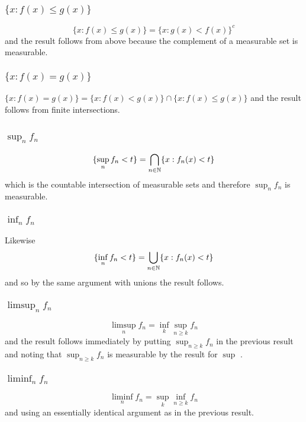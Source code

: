 \documentclass{unswmaths}
\begin{document}
\subsubsection{$\{ x : f(x) \leq g(x) \}$}

$$ \{ x : f(x) \leq g(x) \} = \{ x : g(x) < f(x) \}^{c} $$ and the result follows from above because the complement of a measurable set is measurable.

\subsubsection{$\{ x : f(x) = g(x) \}$}

$\{ x : f(x) = g(x) \} = \{ x : f(x) < g(x) \} \cap \{ x : f(x) \leq g(x) \} $ and the result follows from finite intersections.

\subsection{}
\subsubsection{ $ \sup_n f_n $ }

$$
    \{ \sup_n f_n < t \} = \bigcap_{n \in \mathbb{N}} \{x : f_n(x) < t \}
$$
which is the countable intersection of measurable sets and therefore $ \sup_n f_n $ is measurable.

\subsubsection{ $ \inf_n f_n $ }

Likewise 
$$
    \{ \inf_n f_n < t \} = \bigcup_{n \in \mathbb{N}} \{ x : f_n(x) < t \} 
$$
and so by the same argument with unions the result follows. 

\subsubsection{$ \limsup_n f_n $}
$$
    \limsup_n f_n = \inf_k \sup_{n\geq k} f_n
$$
and the result follows immediately by putting $ \sup_{n \geq k} f_n $ in the previous result and noting that $ \sup_{n \geq k} f_n$ 
is measurable by the result for $ \sup$ .

\subsubsection{$ \liminf_n f_n $}
$$
    \liminf_n f_n = \sup_k \inf_{n\geq k} f_n
$$
and using an essentially identical argument as in the previous result.
\end{document}
